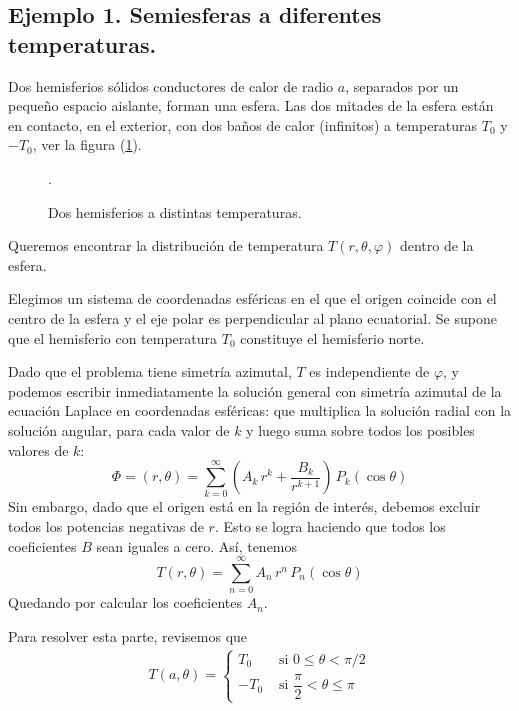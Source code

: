 \subsection{Ejemplo 1. Semiesferas a diferentes temperaturas.}
Dos hemisferios sólidos conductores de calor de radio $a$, separados por un pequeño espacio aislante, forman una esfera. Las dos mitades de la esfera están en contacto, en el exterior, con dos baños de calor (infinitos) a temperaturas $T_{0}$ y $-T_{0} $, ver la figura (\ref{fig:figura_esfera_01}).
\begin{figure}[H]
    \centering
    .
    \caption{Dos hemisferios a distintas temperaturas.}
    \label{fig:figura_esfera_01}
\end{figure}
Queremos encontrar la distribución de temperatura $T(r, \theta, \varphi)$ dentro de la esfera.
\par
Elegimos un sistema de coordenadas esféricas en el que el origen coincide con el centro de la esfera y el eje polar es perpendicular al plano ecuatorial. Se supone que el hemisferio con temperatura $T_{0}$ constituye el hemisferio norte.
\par
Dado que el problema tiene simetría azimutal, $T$ es independiente de $\varphi$, y podemos escribir inmediatamente la solución general con simetría azimutal de la ecuación Laplace en coordenadas esféricas: que multiplica la solución radial con la solución angular, para cada valor de $k$ y luego suma sobre todos los posibles valores de $k$:
\begin{equation}
\Phi = (r, \theta) = \sum_{k=0}^{\infty} \left( A_{k} \, r^{k} + \dfrac{B_{k}}{r^{k+1}} \right) \, P_{k} (\cos \theta)
\label{eq:ecuacion_26_29}
\end{equation}
Sin embargo, dado que el origen está en la región de interés, debemos excluir todos los potencias negativas de $r$. Esto se logra haciendo que todos los coeficientes $B$ sean iguales a cero. Así, tenemos
\begin{equation}
T(r, \theta) = \sum_{n=0}^{\infty} A_{n} \, r^{n} \, P_{n} (\cos \theta)
\label{eq:ecuacion_26_50}
\end{equation}
Quedando por calcular los coeficientes $A_{n}$.
\par
Para resolver esta parte, revisemos que
\begin{align*}
T (a, \theta) = \begin{cases}
T_{0} & \mbox{ si } 0 \leq \theta < \pi / 2 \\
-T_{0} & \mbox{ si } \dfrac{\pi}{2} < \theta \leq \pi
\end{cases}
\end{align*}
